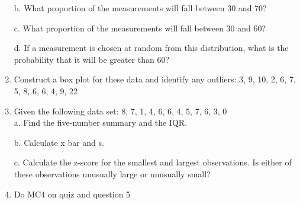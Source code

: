 \documentclass{article}
\begin{document}
\begin{enumerate}
    b. What proportion of the measurements will fall between 30 and 70?

    c. What proportion of the measurements will fall between 30 and 60?
    
    d. If a measurement is chosen at random from this distribution, what is the probability that it will be greater than 60?
    \item Construct a box plot for these data and identify any outliers: 3, 9, 10, 2, 6, 7, 5, 8, 6, 6, 4, 9, 22
    \item Given the following data set: 8, 7, 1, 4, 6, 6, 4, 5, 7, 6, 3, 0 \\
    a. Find the five-number summary and the IQR.
    
    b. Calculate x bar and s.
    
    c. Calculate the z-score for the smallest and largest observations. Is either of these observations unusually large or unusually small?
    \item Do MC4 on quiz and question 5
    
\end{enumerate}
\end{document}
